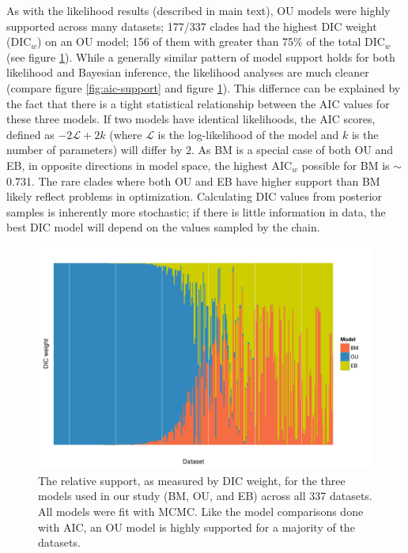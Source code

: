 As with the likelihood results (described in main text), OU models were highly supported across many datasets; 
177/337 clades had the highest DIC weight (DIC$_w$) on an OU model; 156 of them with greater than 75\% of the total DIC$_w$ (see figure \ref{fig:supp-dic-support}). While a generally similar pattern of model support holds for both likelihood and Bayesian inference, the likelihood analyses are much cleaner (compare figure \ref{fig:aic-support} and figure \ref{fig:supp-dic-support}). This differnce can be explained by the fact that there is a tight statistical relationship between the AIC values for these three models. If two models have identical likelihoods, the AIC scores, defined as $-2\mathcal{L} + 2k$ (where $\mathcal{L}$ is the log-likelihood of the model and $k$ is the number of parameters) will differ by $2$. As BM is a special case of both OU and EB, in opposite directions in model space, the highest AIC$_w$ possible for BM is $\sim$0.731. The rare clades where both OU and EB have higher support than BM likely reflect problems in optimization. Calculating DIC values from posterior samples is inherently more stochastic; if there is little information in data, the best DIC model will depend on the values sampled by the chain. 

\begin{figure}[p]
  \centering
  \includegraphics[width=\textwidth]{figs/dic-support}
  \caption[Relative support for models across Angiosperm datasets (Bayesian)]{The relative support, as measured by DIC weight, for the three models used in our study (BM, OU, and EB) across all 337 datasets. All models were fit with MCMC. Like the model comparisons done with AIC, an OU model is highly supported for a majority of the datasets.}
  \label{fig:supp-dic-support}
\end{figure}

